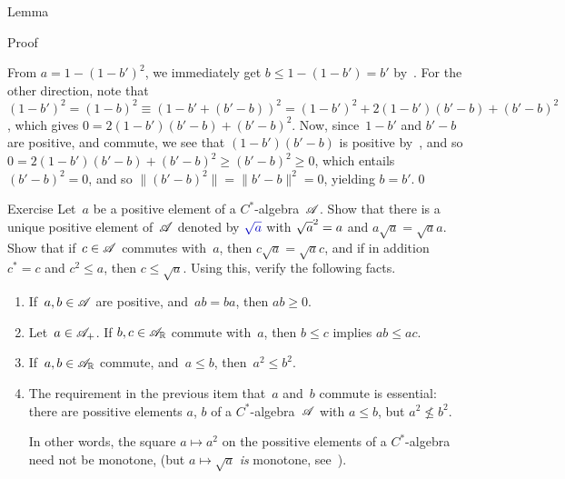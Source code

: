 \documentclass[a]{subfiles}
\begin{document}
\begin{parsec}
\begin{point}{Lemma}
\begin{point}{Proof}
\begin{point}
\begin{point}
From $a=1-(1-b')^2$,
we immediately get $b \leq 1-(1-b')=b'$ by~.
For the other direction,
note that
$(1-b')^2= (1-b)^2 \equiv (1-b'+(b'-b))^2 = (1-b')^2+2(1-b')(b'-b)+(b'-b)^2$,
which gives $0=2(1-b')(b'-b)+(b'-b)^2$.
Now, since~$1-b'$ and $b'-b$ are positive,
and commute, we see that $(1-b')(b'-b)$ is positive 
by~, and so 
 $0=2(1-b')(b'-b)+(b'-b)^2\geq (b'-b)^2 \geq 0$,
which entails $(b'-b)^2=0$, and so $\|(b'-b)^2\|=\|b'-b\|^2=0$,
yielding $b=b'$.\qed
\end{point}
\end{point}
\end{point}
\end{point}
\begin{point}[sqrt]{Exercise}%
Let~$a$ be a positive element of a $C^*$-algebra~$\mathscr{A}$.
Show that there is a unique 
positive element of~$\mathscr{A}$
denoted by $\Define{\sqrt{a}}$ with $\smash{\sqrt{a}^2}=a$
and $a\sqrt{a}=\sqrt{a}a$.
Show that if~$c\in\mathscr{A}$ commutes with~$a$,
then $c\sqrt{a}=\sqrt{a}c$,
and if in addition $c^*=c$ and $c^2\leq a$,
then $c\leq \sqrt{a}$.
Using this, verify the following facts.
\begin{enumerate}
\item
If~$a,b\in \mathscr{A}$ are positive,
and~$ab=ba$,
then $ab\geq 0$.

\item
Let~$a\in\mathscr{A}_{+}$.
If $b,c\in \mathscr{A}_{\mathbb{R}}$ commute with~$a$,
then $b\leq c$ implies $ab\leq ac$.

\item
If~$a,b\in\mathscr{A}_{\mathbb{R}}$ commute, and~$a\leq b$, then~$a^2\leq b^2$.

\item
The requirement in the previous item  that~$a$ and~$b$ commute is essential:
there are possitive elements $a$, $b$ of a $C^*$-algebra~$\mathscr{A}$
with $a\leq b$, but $a^2 \nleq b^2$.

In other words, the square $a\mapsto a^2$
on the possitive elements of a $C^*$-algebra
need not be monotone,
(but $a\mapsto \sqrt{a}$ \emph{is} monotone, see~\TODO{}).


\end{enumerate}
\end{point}
\end{parsec}
\end{document}
